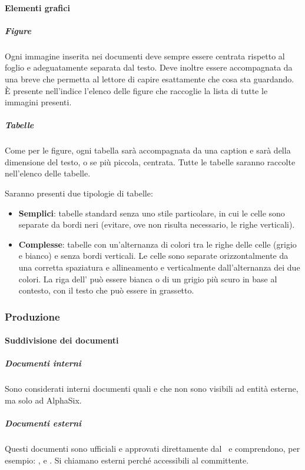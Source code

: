 			\paragraph{Elementi grafici}

			\subparagraph{Figure}
			Ogni immagine inserita nei documenti deve sempre essere centrata rispetto al foglio e adeguatamente separata dal testo. Deve inoltre essere
			accompagnata da una breve  che permetta al lettore di capire esattamente che cosa sta guardando. È presente nell'indice l'elenco
			delle figure che raccoglie la lista di tutte le immagini presenti.

			\subparagraph{Tabelle}
			Come per le figure, ogni tabella sarà accompagnata da una caption e sarà della dimensione del testo, o se più piccola, centrata.
			Tutte le tabelle saranno raccolte nell'elenco delle tabelle.\par
			Saranno presenti due tipologie di tabelle:
			\begin{itemize}
				\item \textbf{Semplici}: tabelle standard senza uno stile particolare, in cui le celle sono separate da bordi neri (evitare, ove non risulta necessario,
					le righe verticali).
				\item \textbf{Complesse}: tabelle con un'alternanza di colori tra le righe delle celle (grigio e bianco) e senza bordi verticali.
					Le celle sono separate orizzontalmente da una corretta spaziatura e allineamento e verticalmente dall'alternanza dei due colori.
					La riga dell' può essere bianca o di un grigio più scuro in base al contesto, con il testo che può essere in grassetto.
			\end{itemize}


		\subsubsection{Produzione}

			\paragraph{Suddivisione dei documenti}

			\subparagraph{Documenti interni}
			Sono considerati interni documenti quali \Doc{\SdF} e \Doc{\NdP} che non sono visibili ad entità esterne,
			ma solo ad AlphaSix.

			\subparagraph{Documenti esterni}
			Questi documenti sono ufficiali e approvati direttamente dal \Res\ e comprendono, per esempio: \Doc{\PdP},
			\Doc{\PdQ} e \Doc{\AdR}. Si chiamano esterni perché accessibili al committente.

